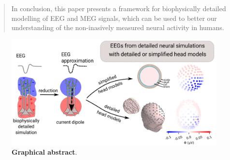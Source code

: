 \documentclass[preprint,10pt,authoryear]{elsarticle}
\begin{document}
\begin{frontmatter}
\begin{abstract}
In conclusion, this paper presents a framework for biophysically detailed modelling of EEG and MEG signals, which can be used to better our understanding of the non-inasively measured neural activity in humans.

	\end{abstract}
	
\end{frontmatter}


	

\begin{figure}[H]
	\centering
	\includegraphics[width=1.0\textwidth]{graph_abst}
	\textbf{Graphical abstract}.
\end{figure}
\end{document}
